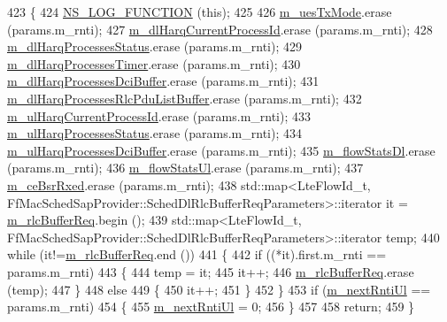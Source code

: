 \begin{DoxyCode}
423 \{
424   \hyperlink{log-macros-disabled_8h_a90b90d5bad1f39cb1b64923ea94c0761}{NS\_LOG\_FUNCTION} (\textcolor{keyword}{this});
425 
426   \hyperlink{classns3_1_1PfFfMacScheduler_afde3fb192a83a5fafc27ed9a0df82de9}{m\_uesTxMode}.erase (params.m\_rnti);
427   \hyperlink{classns3_1_1PfFfMacScheduler_a792f015651334a9e688d534367f29155}{m\_dlHarqCurrentProcessId}.erase (params.m\_rnti);
428   \hyperlink{classns3_1_1PfFfMacScheduler_a438c2319e01eaac65f64cbd82b3e8089}{m\_dlHarqProcessesStatus}.erase  (params.m\_rnti);
429   \hyperlink{classns3_1_1PfFfMacScheduler_ab115ef9abb936f35aeb5979a8ed8928d}{m\_dlHarqProcessesTimer}.erase (params.m\_rnti);
430   \hyperlink{classns3_1_1PfFfMacScheduler_af3c0c393dc246b7b6a907539362c935b}{m\_dlHarqProcessesDciBuffer}.erase  (params.m\_rnti);
431   \hyperlink{classns3_1_1PfFfMacScheduler_acf9952b5bb3d26644b5e25054ca6e385}{m\_dlHarqProcessesRlcPduListBuffer}.erase  (params.m\_rnti);
432   \hyperlink{classns3_1_1PfFfMacScheduler_aff9dac165a5c80c99f237adf365321d6}{m\_ulHarqCurrentProcessId}.erase  (params.m\_rnti);
433   \hyperlink{classns3_1_1PfFfMacScheduler_a5d5e9dcdbb7d0a291fe397ba7b746d04}{m\_ulHarqProcessesStatus}.erase  (params.m\_rnti);
434   \hyperlink{classns3_1_1PfFfMacScheduler_a694ef4299832b3652468b0898601b2de}{m\_ulHarqProcessesDciBuffer}.erase  (params.m\_rnti);
435   \hyperlink{classns3_1_1PfFfMacScheduler_a00b148349167b85ab9170570e2530b92}{m\_flowStatsDl}.erase  (params.m\_rnti);
436   \hyperlink{classns3_1_1PfFfMacScheduler_a1c3919a5dcda7ca29e667e2bca774ca5}{m\_flowStatsUl}.erase  (params.m\_rnti);
437   \hyperlink{classns3_1_1PfFfMacScheduler_a9d4cd2380a8e04f1e7d69ac67628b9cc}{m\_ceBsrRxed}.erase (params.m\_rnti);
438   std::map<LteFlowId\_t, FfMacSchedSapProvider::SchedDlRlcBufferReqParameters>::iterator it = 
      \hyperlink{classns3_1_1PfFfMacScheduler_aaad15dd674acb600fb8dc9263fcfa2bc}{m\_rlcBufferReq}.begin ();
439   std::map<LteFlowId\_t, FfMacSchedSapProvider::SchedDlRlcBufferReqParameters>::iterator temp;
440   \textcolor{keywordflow}{while} (it!=\hyperlink{classns3_1_1PfFfMacScheduler_aaad15dd674acb600fb8dc9263fcfa2bc}{m\_rlcBufferReq}.end ())
441     \{
442       \textcolor{keywordflow}{if} ((*it).first.m\_rnti == params.m\_rnti)
443         \{
444           temp = it;
445           it++;
446           \hyperlink{classns3_1_1PfFfMacScheduler_aaad15dd674acb600fb8dc9263fcfa2bc}{m\_rlcBufferReq}.erase (temp);
447         \}
448       \textcolor{keywordflow}{else}
449         \{
450           it++;
451         \}
452     \}
453   \textcolor{keywordflow}{if} (\hyperlink{classns3_1_1PfFfMacScheduler_ad4bed67ae396b364734c2cc0acc7e2ec}{m\_nextRntiUl} == params.m\_rnti)
454     \{
455       \hyperlink{classns3_1_1PfFfMacScheduler_ad4bed67ae396b364734c2cc0acc7e2ec}{m\_nextRntiUl} = 0;
456     \}
457 
458   \textcolor{keywordflow}{return};
459 \}
\end{DoxyCode}


